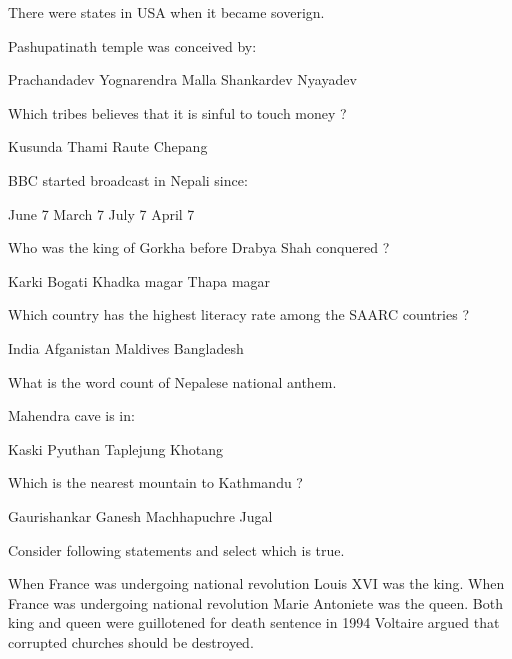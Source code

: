 \begin{questions}
\question There were \fillin[][2cm] states in USA when it became soverign.
  \begin{choices}
  \end{choices}

\question Pashupatinath temple was conceived by:
  \begin{choices}
  \choice Prachandadev
  \choice Yognarendra Malla
  \choice Shankardev
  \choice Nyayadev
  \end{choices}

\question Which tribes believes that it is sinful to touch money ?
  \begin{choices}
  \choice Kusunda
  \choice Thami
  \choice Raute
  \choice Chepang
  \end{choices}

\question BBC started broadcast in Nepali since:
  \begin{choices}
   June 7
   March 7
   July 7
   April 7
  \end{choices}

\question Who was the king of Gorkha before Drabya Shah conquered ?
  \begin{choices}
  \choice Karki
  \choice Bogati
  \choice Khadka magar
  \choice Thapa magar
  \end{choices}

\question Which country has the highest literacy rate among the SAARC countries ?
  \begin{choices}
  \choice India
  \choice Afganistan
  \choice Maldives
  \choice Bangladesh
  \end{choices}

\question What is the word count of Nepalese national anthem.
  \begin{choices}
  \end{choices}

\question Mahendra cave is in:
  \begin{choices}
  \choice Kaski
  \choice Pyuthan
  \choice Taplejung
  \choice Khotang
  \end{choices}

\question Which is the nearest mountain to Kathmandu ?
  \begin{choices}
  \choice Gaurishankar
  \choice Ganesh
  \choice Machhapuchre
  \choice Jugal
  \end{choices}

\question Consider following statements and select which is true.
  \begin{choices}
  \choice When France was undergoing national revolution Louis XVI was the king.
  \choice When France was undergoing national revolution Marie Antoniete was the queen.
  \choice Both king and queen were guillotened for death sentence in 1994
  \choice Voltaire argued that corrupted churches should be destroyed.
  \end{choices}


\end{questions}
